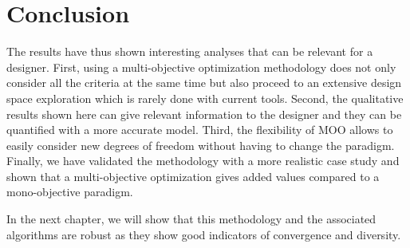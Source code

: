 \section{Conclusion}

The results have thus shown interesting analyses that can be relevant for a designer. First, using a multi-objective optimization methodology does not only consider all the criteria at the same time but also proceed to an extensive design space exploration which is rarely done with current tools. Second, the qualitative results shown here can give relevant information to the designer and they can be quantified with a more accurate model. Third, the flexibility of MOO allows to easily consider new degrees of freedom without having to change the paradigm. Finally, we have validated the methodology with a more realistic case study and shown that a multi-objective optimization gives added values compared to a mono-objective paradigm.

In the next chapter, we will show that this methodology and the associated algorithms are robust as they show good indicators of convergence and diversity.